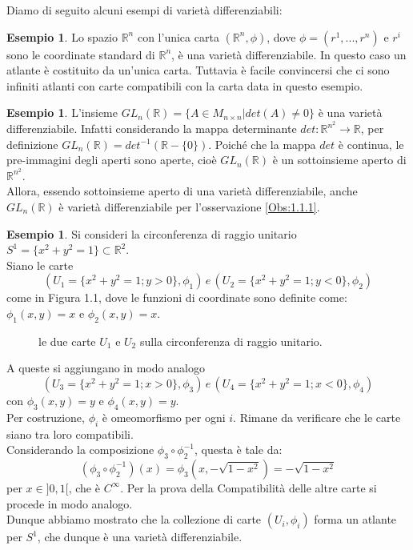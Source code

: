 \documentclass[12pt,a4paper]{report}
\theoremstyle{definition}
\theoremstyle{Theorem}
\theoremstyle{definition}
\newtheorem{Ex}[Def]{Esempio}
\theoremstyle{definition}
\theoremstyle{definition}
\begin{document}
Diamo di seguito alcuni esempi di varietà differenziabili:
\begin{Ex}
	Lo spazio $\mathbb{R}^n$ con l'unica carta $(\mathbb{R}^n,\phi)$, dove $\phi=(r^1,...,r^n)$ e $r^i$ sono le coordinate standard di $\mathbb{R}^n$, è una varietà differenziabile. In questo caso un atlante è costituito da un'unica carta. Tuttavia è facile convincersi che ci sono infiniti atlanti con carte compatibili con la carta data in questo esempio.
\end{Ex}
\begin{Ex} \label{Ex 1.1}
	L'insieme $GL_n(\mathbb{R})=\{A\in M_{n\times n}|det(A)\neq0\}$ è una varietà differenziabile.
	Infatti considerando la mappa determinante $det:\mathbb{R}^{n^2}\rightarrow \mathbb{R}$, per definizione $GL_n(\mathbb{R})=det^{-1}(\mathbb{R}-\{0\})$. Poiché che la mappa $det$ è continua, le pre-immagini degli aperti sono aperte, cioè $GL_n(\mathbb{R})$ è un sottoinsieme aperto di $\mathbb{R}^{n^2}$.\\
	Allora, essendo sottoinsieme aperto di una varietà differenziabile, anche $GL_n(\mathbb{R})$ è varietà differenziabile per l'osservazione \ref{Obs:1.1.1}.\\
\end{Ex}
\begin{Ex}
	Si consideri la circonferenza di raggio unitario $S^1=\{x^2+y^2=1\}\subset \mathbb{R}^2$.\\
	Siano le carte $$(U_1=\{x^2+y^2=1;y>0\},\phi_1) \, e \,  (U_2=\{x^2+y^2=1;y<0\},\phi_2)$$ come in Figura 1.1, dove le funzioni di coordinate sono definite come: $\phi_1(x,y)=x$ e $\phi_2(x,y)=x$.
	\begin{figure}[H]
		\centering
	\label{figura 1}
	\caption{le due carte $U_1$ e $U_2$ sulla circonferenza di raggio unitario.}
	\end{figure}
A queste si aggiungano in modo analogo $$(U_3=\{x^2+y^2=1;x>0\},\phi_3)\, e \, (U_4=\{x^2+y^2=1;x<0\},\phi_4)$$ con $\phi_3(x,y)=y$ e $\phi_4(x,y)=y$.\\
Per costruzione, $\phi_i$ è omeomorfismo per ogni $i$. Rimane da verificare che le carte siano tra loro compatibili.\\
Considerando la composizione $\phi_3\circ\phi_2^{-1}$, questa è tale da: $$(\phi_3\circ\phi_2^{-1})(x)=\phi_3(x,-\sqrt{1-x^2})=-\sqrt{1-x^2}$$ per $x\in ]0,1[$, che è $C^\infty$. Per la prova della Compatibilità delle altre carte si procede in modo analogo.\\ 
Dunque abbiamo mostrato che la collezione di carte $(U_i,\phi_i)$ forma un atlante per $S^1$, che dunque è una varietà differenziabile.
\end{Ex}
\end{document}
